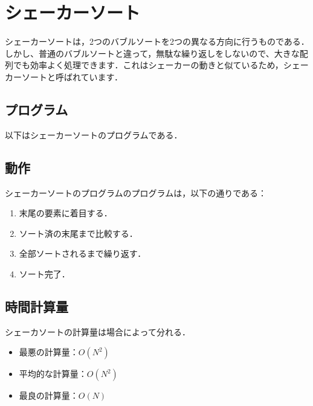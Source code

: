\documentclass[a4j, titlepage]{jarticle}
\begin{document}
        
    \section{シェーカーソート}
        シェーカーソートは，2つのバブルソートを2つの異なる方向に行うものである．しかし、普通のバブルソートと違って，無駄な繰り返しをしないので、大きな配列でも効率よく処理できます\cite{cite:geek}．これはシェーカーの動きと似ているため，シェーカーソートと呼ばれています．

        \subsection{プログラム}
            以下はシェーカーソートのプログラムである．
            
        
        \subsection{動作}
        シェーカーソートのプログラムのプログラムは，以下の通りである：
            \begin{screen}
                \begin{enumerate}
                    \item 末尾の要素に着目する．
                    \item ソート済の末尾まで比較する．
                    \item 全部ソートされるまで繰り返す．
                    \item ソート完了．
                \end{enumerate}
            \end{screen}
        
        \subsection{時間計算量}
            シェーカソートの計算量は場合によって分れる．
            \begin{itemize}
                \item 最悪の計算量：$O(N^2)$
                \item 平均的な計算量：$O(N^2)$
                \item 最良の計算量：$O(N)$
            \end{itemize}
\end{document}
